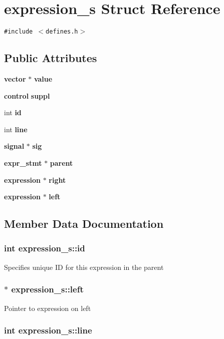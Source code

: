 \section{expression\_\-s Struct Reference}
\label{structexpression__s}
{\tt \#include $<$defines.h$>$}

\subsection*{Public Attributes}
\begin{CompactItemize}
\item 
{\bf vector} $\ast$ {\bf value}
\item 
{\bf control} {\bf suppl}
\item 
int {\bf id}
\item 
int {\bf line}
\item 
{\bf signal} $\ast$ {\bf sig}
\item 
{\bf expr\_\-stmt} $\ast$ {\bf parent}
\item 
{\bf expression} $\ast$ {\bf right}
\item 
{\bf expression} $\ast$ {\bf left}
\end{CompactItemize}


\subsection{Member Data Documentation}
\subsubsection{\setlength{\rightskip}{0pt plus 5cm}int expression\_\-s::id}\label{structexpression__s_m2}


Specifies unique ID for this expression in the parent 
\subsubsection{$\ast$ expression\_\-s::left}\label{structexpression__s_m7}


Pointer to expression on left 
\subsubsection{\setlength{\rightskip}{0pt plus 5cm}int expression\_\-s::line}\label{structexpression__s_m3}


